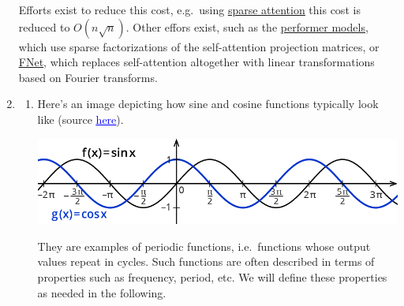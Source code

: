 \documentclass[11pt,a4paper]{article}
\begin{document}
\begin{enumerate}[label=(\alph*)]
          Efforts exist to reduce this cost, e.g.\ using
          \href{https://arxiv.org/pdf/1904.10509v1.pdf}{\underline{sparse attention}}
          this cost is reduced to $O(n\sqrt{n})$.
          Other effors exist, such as the
          \href{https://arxiv.org/pdf/2009.14794.pdf}{\underline{performer models}},
          which use sparse factorizations of the self-attention projection
          matrices, or \href{https://arxiv.org/pdf/2105.03824.pdf}{\underline{FNet}},
          which replaces self-attention altogether with linear transformations
          based on Fourier transforms.
    \item
          \begin{enumerate}[label=(\roman*)]
              \item Here's an image depicting how sine and cosine functions
                    typically look like (source
                    \href{https://www.kapiert.de/sinus-und-kosinusfunktionen-eigenschaften/}{\textcolor{blue}{\underline{here}}}).
                    \begin{center}
                        \includegraphics[scale=0.7]{img/sin_cos_2.png}
                    \end{center}
                    They are examples of periodic functions, i.e.\ functions
                    whose output values repeat in cycles.
                    Such functions are often described in terms of properties
                    such as frequency, period, etc.
                    We will define these properties as needed in the following.


\end{enumerate}
\end{enumerate}
\end{document}
